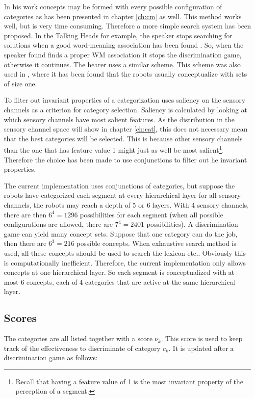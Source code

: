 In his work  concepts may be formed with every possible configuration of categories as has been presented in chapter \ref{ch:cm} as well. This method works well, but is very time consuming. Therefore a more simple search system has been proposed. In the Talking Heads for example, the speaker stops searching for solutions when a good word-meaning association has been found \cite{steels:2000}. So, when the speaker found finds a proper WM association it stops the discrimination game, otherwise it continues. The hearer uses a similar scheme. This scheme was also used in \cite{vogt:1998b}, where it has been found that the robots usually conceptualize with sets of size one. 

To filter out invariant properties of a categorization  uses saliency on the sensory channels as a criterion for category selection. Saliency is calculated by looking at which sensory channels have most salient features. As the distribution in the sensory channel space will show in chapter \ref{ch:cat}, this does not necessary mean that the best categories will be selected. This is because other sensory channels than the one that has feature value 1 might just as well be most salient\footnote{Recall that having a feature value of 1 is the most invariant property of the perception of a segment.}. Therefore the choice has been made to use conjunctions to filter out he invariant properties.

The current implementation uses conjunctions of categories, but suppose the robots have categorized each segment at every hierarchical layer for all sensory channels, the robots may reach a depth of 5 or 6 layers. With 4 sensory channels, there are then $6^4=1296$ possibilities for each segment (when all possible configurations are allowed, there are $7^4=2401$ possibilities). A discrimination game can yield many concept sets. Suppose that one category can do the job, then there are $6^3=216$ possible concepts. When exhaustive search method is used, all these concepts should be used to search the lexicon etc.. Obviously this is computationally inefficient. Therefore, the current implementation only allows concepts at one hierarchical layer. So each segment is conceptualized with at most 6 concepts, each of 4 categories that are active at the same hierarchical layer.

\subsection{Scores}
The categories are all listed together with a score $\nu_k$. This score is used to keep track of the effectiveness to discriminate of category $c_k$. It is updated after a discrimination game as follows:

